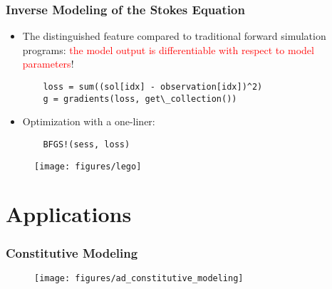 \documentclass[usenames,dvipsnames]{beamer}
\begin{document}
\begin{frame}[fragile]{}
	\frametitle{Inverse Modeling of the Stokes Equation}
	
	\begin{itemize}
		\item The distinguished feature compared to traditional forward simulation programs: \textcolor{red}{the model output is differentiable with respect to model parameters}!
		\begin{verbatim}
	loss = sum((sol[idx] - observation[idx])^2)
	g = gradients(loss, get\_collection())
		\end{verbatim}
		\item Optimization with a one-liner:
		\begin{verbatim}
	BFGS!(sess, loss)
		\end{verbatim}	 
	\end{itemize}
	
	\begin{figure}[hbt]
		\centering
		\texttt{[image: figures/lego]}
	\end{figure}
	
\end{frame}









\section{Applications}


\begin{frame}
	\frametitle{Constitutive Modeling}
	
	\begin{figure}[hbt]
		\centering
		\texttt{[image: figures/ad\_constitutive\_modeling]}
	\end{figure}
\end{frame}
\end{document}
